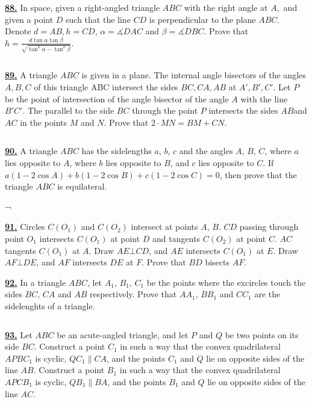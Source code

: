 \documentclass{article}
\begin{document}
$$ $$

\href{ http://www.artofproblemsolving.com/Forum/viewtopic.php?p=310011#p310011
}{\bf 88.}  In space, given a right-angled triangle $ABC$ with the right angle at $A,$ and given a point $D$ such that the line $CD$ is perpendicular to the plane $ABC.$ Denote $d = AB, h = CD$, $\alpha=\measuredangle DAC$ and $\beta=\measuredangle DBC$. Prove that $h=\frac{d\tan\alpha\tan\beta}{\sqrt{\tan^2\alpha-\tan^2\beta}}$.


$$ $$

\href{http://www.artofproblemsolving.com/Forum/viewtopic.php?p=311023#p311023
 }{\bf 89.} A triangle $ABC$ is given in a plane. The internal angle bisectors of the angles $A, B, C$ of this triangle ABC intersect the sides $BC, CA, AB$ at $A', B', C'.$ Let $P$ be the point of intersection of the angle bisector of the angle $A$ with the line $B'C'.$ The parallel to the side $BC$ through the point $P$ intersects the sides $AB $and $AC$ in the points $M$ and $N.$ Prove that $2\cdot MN = BM + CN$.

$$ $$


\href{http://www.artofproblemsolving.com/Forum/viewtopic.php?p=307795#p307795
 }{\bf 90.} A triangle $ABC$ has the sidelengths $a$, $b$, $c$ and the angles $A$, $B$, $C$, where $a$ lies opposite to $A$, where $b$ lies opposite to $B$, and $c$ lies opposite to $C$.
If $a\left(1-2 \cos A\right)+b\left(1-2 \cos B\right)+c\left(1-2 \cos C\right) = 0$, then prove that the triangle $ABC$ is equilateral.

$$ $$
¬

\href{ http://www.artofproblemsolving.com/Forum/viewtopic.php?p=376521#p376521
}{\bf 91.}  Circles $C(O_1)$ and $C(O_2)$ intersect at points $A$, $B$. $CD$ passing through point $O_1$ intersects $C(O_1)$ at point $D$ and tangents $C(O_2)$ at point $C$. $AC$ tangents $C(O_1)$ at $A$. Draw $AE \bot CD$, and $AE$ intersects $C(O_1)$ at $E$. Draw $AF \bot DE$, and $AF$ intersects $DE$ at $F$. Prove that $BD$ bisects $AF$.


\href{http://www.artofproblemsolving.com/Forum/viewtopic.php?p=292643#p292643
 }{\bf 92.} In a triangle $ABC$, let $A_{1}$, $B_{1}$, $C_{1}$ be the points where the excircles touch the sides $BC$, $CA$ and $AB$ respectively. Prove that $A A_{1}$, $B B_{1}$ and $C C_{1}$ are the sidelenghts of a triangle.

$$ $$


\href{http://www.artofproblemsolving.com/Forum/viewtopic.php?p=213011#p213011
 }{\bf 93.} Let $ABC$ be an acute-angled triangle, and let $P$ and $Q$ be two points on its side $BC$. Construct a point $C_{1}$ in such a way that the convex quadrilateral $APBC_{1}$ is cyclic, $QC_{1}\parallel CA$, and the points $C_{1}$ and $Q$ lie on opposite sides of the line $AB$. Construct a point $B_{1}$ in such a way that the convex quadrilateral $APCB_{1}$ is cyclic, $QB_{1}\parallel BA$, and the points $B_{1}$ and $Q$ lie on opposite sides of the line $AC$.  
\end{document}
